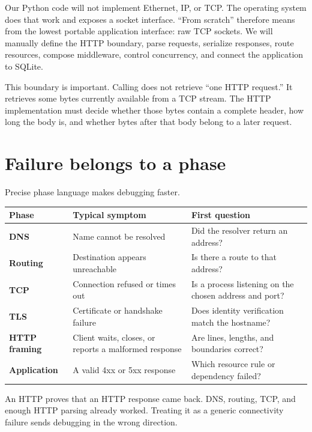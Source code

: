 Our Python code will not implement Ethernet, IP, or TCP. The operating system
does that work and exposes a socket interface. ``From scratch'' therefore
means from the lowest portable application interface: raw TCP sockets. We will
manually define the HTTP boundary, parse requests, serialize responses, route
resources, compose middleware, control concurrency, and connect the application
to SQLite.

This boundary is important. Calling  does not retrieve ``one HTTP
request.'' It retrieves some bytes currently available from a TCP stream. The
HTTP implementation must decide whether those bytes contain a complete header,
how long the body is, and whether bytes after that body belong to a later
request.

\section{Failure belongs to a phase}

Precise phase language makes debugging faster.

\begin{center}
\begin{tabularx}{\textwidth}{@{}>{\bfseries}p{28mm} X X@{}}
\toprule
Phase & Typical symptom & First question \\
\midrule
DNS & Name cannot be resolved & Did the resolver return an address? \\
Routing & Destination appears unreachable & Is there a route to that address? \\
TCP & Connection refused or times out & Is a process listening on the chosen address and port? \\
TLS & Certificate or handshake failure & Does identity verification match the hostname? \\
HTTP framing & Client waits, closes, or reports a malformed response & Are lines, lengths, and boundaries correct? \\
Application & A valid 4xx or 5xx response & Which resource rule or dependency failed? \\
\bottomrule
\end{tabularx}
\end{center}

\begin{pitfall}
An HTTP  proves that an HTTP response came back. DNS,
routing, TCP, and enough HTTP parsing already worked. Treating it as a generic
connectivity failure sends debugging in the wrong direction.
\end{pitfall}

